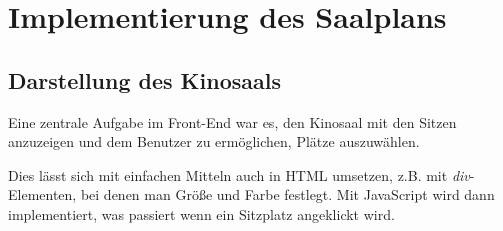 \section{Implementierung des Saalplans}
\authorsection{\authorNL}

\subsection{Darstellung des Kinosaals}

Eine zentrale Aufgabe im Front-End war es, den Kinosaal mit den Sitzen anzuzeigen und dem Benutzer zu ermöglichen, Plätze auszuwählen.

Dies lässt sich mit einfachen Mitteln auch in \acs{HTML} umsetzen, z.B. mit \textit{div}-Elementen, bei denen man Größe und Farbe festlegt.
Mit JavaScript wird dann implementiert, was passiert wenn ein Sitzplatz angeklickt wird.

